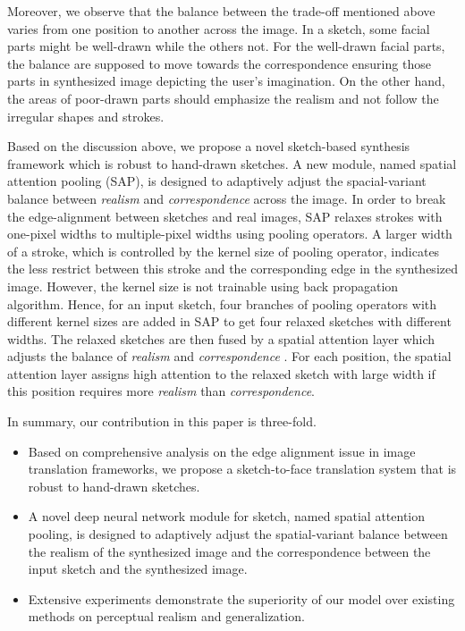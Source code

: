 Moreover, we observe that the balance between the trade-off mentioned above varies from one position to another across the image. In a sketch, some facial parts might be well-drawn while the others not. For the well-drawn facial parts, the balance are supposed to move towards the correspondence ensuring those parts in synthesized image depicting the user's imagination. On the other hand, the areas of poor-drawn parts should emphasize the realism and not follow the irregular shapes and strokes.

Based on the discussion above, we propose a novel sketch-based synthesis framework which is robust to hand-drawn sketches. A new module, named spatial attention pooling (SAP), is designed to adaptively adjust the spacial-variant balance between \textit{realism} and \textit{correspondence} across the image. In order to break the edge-alignment between sketches and real images, SAP relaxes strokes with one-pixel widths to multiple-pixel widths using pooling operators. A larger width of a stroke, which is controlled by the kernel size of pooling operator, indicates the less restrict between this stroke and the corresponding edge in the synthesized image. However, the kernel size is not trainable using back propagation algorithm. Hence, for an input sketch, four branches of pooling operators with different kernel sizes are added in SAP to get four relaxed sketches with different widths. The relaxed sketches are then fused by a spatial attention layer which adjusts the balance of \textit{realism} and \textit{correspondence} . For each position, the spatial attention layer assigns high attention to the relaxed sketch with large width if this position requires more \textit{realism} than \textit{correspondence}. 

In summary, our contribution in this paper is three-fold.
\begin{itemize}
	\item Based on comprehensive analysis on the edge alignment issue in image translation frameworks, we propose a sketch-to-face translation system that is robust to hand-drawn sketches. 
	\item A novel deep neural network module for sketch, named spatial attention pooling, is designed to adaptively adjust the spatial-variant balance between the realism of the synthesized image and the correspondence between the input sketch and the synthesized image.
	\item Extensive experiments demonstrate the superiority of our model over existing methods on perceptual realism and generalization.
\end{itemize}
